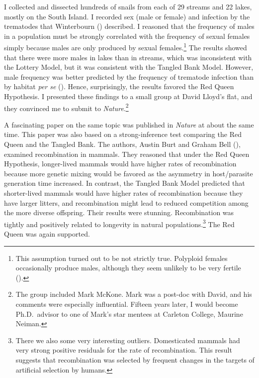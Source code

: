\documentclass[
  letterpaper,
]{book}
\begin{document}
I collected and dissected hundreds of snails from each of 29 streams and
22 lakes, mostly on the South Island. I recorded sex (male or female)
and infection by the trematodes that Winterbourn
() described. I reasoned that the
frequency of males in a population must be strongly correlated with the
frequency of sexual females simply because males are only produced by
sexual females.\footnote{This assumption turned out to be not strictly
  true. Polyploid females occasionally produce males, although they seem
  unlikely to be very fertile ().} The results showed that there were more males in lakes
than in streams, which was inconsistent with the Lottery Model, but it
was consistent with the Tangled Bank Model. However, male frequency was
better predicted by the frequency of trematode infection than by habitat
\emph{per se} (). Hence,
surprisingly, the results favored the Red Queen Hypothesis. I presented
these findings to a small group at David Lloyd's flat, and they
convinced me to submit to \emph{Nature}.\footnote{The group included
  Mark McKone. Mark was a post-doc with David, and his comments were
  especially influential. Fifteen years later, I would become
  Ph.D.~advisor to one of Mark's star mentees at Carleton College,
  Maurine Neiman.}

A fascinating paper on the same topic was published in \emph{Nature} at
about the same time. This paper was also based on a strong-inference
test comparing the Red Queen and the Tangled Bank. The authors, Austin
Burt and Graham Bell (), examined
recombination in mammals. They reasoned that under the Red Queen
Hypothesis, longer-lived mammals would have higher rates of
recombination because more genetic mixing would be favored as the
asymmetry in host/parasite generation time increased. In contrast, the
Tangled Bank Model predicted that shorter-lived mammals would have
higher rates of recombination because they have larger litters, and
recombination might lead to reduced competition among the more diverse
offspring. Their results were stunning. Recombination was tightly and
positively related to longevity in natural populations.\footnote{There
  we also some very interesting outliers. Domesticated mammals had very
  strong positive residuals for the rate of recombination. This result
  suggests that recombination was selected by frequent changes in the
  targets of artificial selection by humans.} The Red Queen was again
supported.
\end{document}
